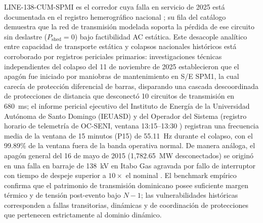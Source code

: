 LINE-138-CUM-SPMI es el corredor cuya falla en servicio de 2025 está documentada en el registro hemerográfico nacional \cite{listin2025}; su fila del catálogo demuestra que la red de transmisión modelada soporta la pérdida de ese circuito sin deslastre ($P_{\mathrm{shed}} = 0$) bajo factibilidad AC estática. Este desacople analítico entre capacidad de transporte estática y colapsos nacionales históricos está corroborado por registros periciales primarios: investigaciones técnicas independientes del colapso del 11 de noviembre de 2025 \cite{uasdInformeSPM1_2025} establecieron que el apagón fue iniciado por maniobras de mantenimiento en S/E SPM1, la cual carecía de protección diferencial de barras, disparando una cascada descoordinada de protecciones de distancia que desconectó 10 circuitos de transmisión en 680~ms; el informe pericial ejecutivo del Instituto de Energía de la Universidad Autónoma de Santo Domingo (IEUASD) \cite{uasdInformeSPM1_2025} y del Operador del Sistema (registro horario de telemetría de OC-SENI, ventana 13:15--13:30 \cite{ocseniScadaP15_2025}) registran una frecuencia media de la ventana de 15 minutos (P15) de 55.11~Hz durante el colapso, con el 99.89\% de la ventana fuera de la banda operativa normal. De manera análoga, el apagón general del 16 de mayo de 2015 (1,782.65~MW desconectados) se originó en una falla en barraje de 138~kV en Itabo Gas agravada por fallo de interruptor con tiempo de despeje superior a $10\times$ el nominal \cite{listinItaboGas_2015}. El benchmark empírico confirma que el patrimonio de transmisión dominicano posee suficiente margen térmico y de tensión post-evento bajo $N-1$; las vulnerabilidades históricas corresponden a fallas transitorias, dinámicas y de coordinación de protecciones que pertenecen estrictamente al dominio dinámico.


